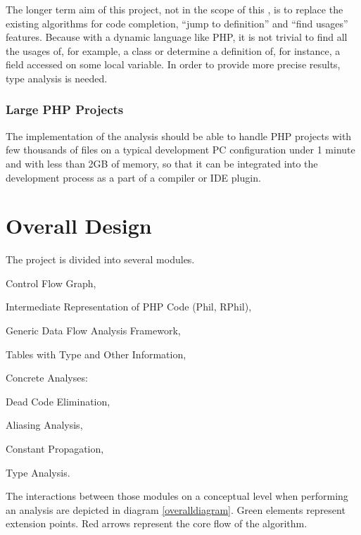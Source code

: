     The longer term aim of this project, not in the scope 
    of this \wthesis{}, is to replace the existing 
    algorithms for code completion, ``jump to definition'' 
    and ``find usages'' features. Because 
    with a dynamic language like PHP, it is not trivial to 
    find all the usages of, for example, a class or determine 
    a definition of, for instance, a field accessed 
    on some local variable. In order to provide more 
    precise results, type analysis is needed.
    
    \subsubsection*{Large PHP Projects}
    The implementation of the analysis should be able to handle 
    PHP projects with few thousands of files on a typical development 
    PC configuration under 1 minute and with less than 2GB of memory, 
    so that it can be integrated into the development process as a 
    part of a compiler or IDE plugin.
    
    \section{Overall Design}
    \label{overalldesign}
    
    The project is divided into several modules.
    \begin{itemize*}
        \item Control Flow Graph,
        \item Intermediate Representation of PHP Code (Phil, RPhil),
        \item Generic Data Flow Analysis Framework, 
        \item Tables with Type and Other Information, 
        \item Concrete Analyses:
        \begin{itemize*}
            \item Dead Code Elimination, 
            \item Aliasing Analysis, 
            \item Constant Propagation,
            \item Type Analysis.
        \end{itemize*}
    \end{itemize*}
    
    The interactions between those modules on a conceptual level 
    when performing an analysis are depicted in diagram \ref{overalldiagram}. 
    Green elements represent extension points. Red arrows represent the 
    core flow of the algorithm.

